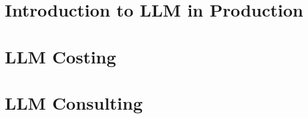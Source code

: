 \section[Prod]{Introduction to LLM in Production}


\section[Cost]{LLM Costing}


\section[Consult]{LLM Consulting}
